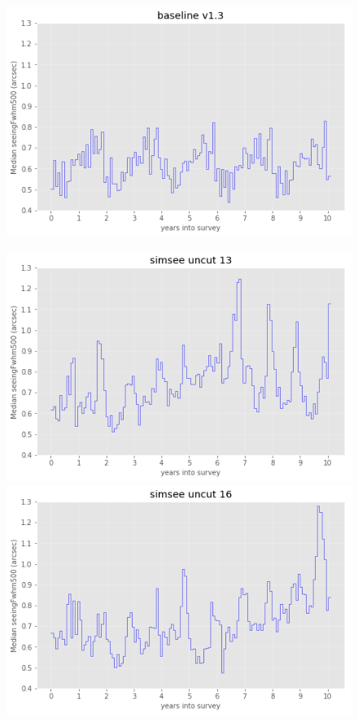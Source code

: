 \documentclass[\docopts]{\docclass}
\begin{document}
\begin{figure}
\begin{center}
  \includegraphics[width=\columnwidth]{seeing_baseline_v1_3_10yrs.png}
\endminipage\hfill
\end{center}
  \includegraphics[width=\columnwidth]{seeing_ss58777y13_v1_3_10yrs.png}
\endminipage\hfill
{}
  \includegraphics[width=\columnwidth]{seeing_ss58777y16_v1_3_10yrs.png}

\end{figure}
\end{document}
